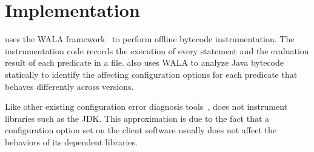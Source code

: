 \section{Implementation}
\label{sec:implementation}

\ourtool uses the WALA framework~\cite{wala} to perform offline
bytecode instrumentation. The instrumentation code
records the execution of every statement and the evaluation
result of each predicate
in a file. \ourtool also uses WALA
to analyze Java bytecode statically to
identify the affecting configuration options
for each predicate that behaves differently across versions.

Like other existing configuration error
diagnosis tools~\cite{Rabkin:2011:PPC, Zhang:2013:ADS}, \ourtool
does not instrument libraries such as the JDK.
This approximation is due to the fact that a configuration
option set on the client software usually
does not affect the behaviors of its dependent libraries.

